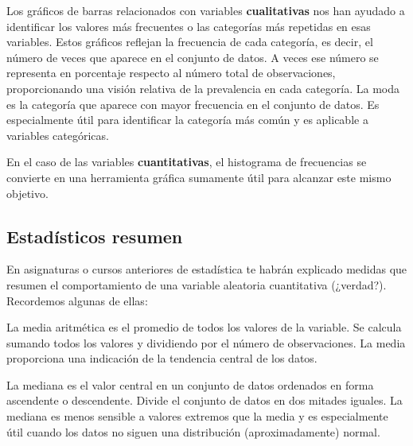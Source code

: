 \documentclass[
  letterpaper,
  DIV=11,
  numbers=noendperiod]{scrreprt}
\begin{document}
Los gráficos de barras relacionados con variables \textbf{cualitativas}
nos han ayudado a identificar los valores más frecuentes o las
categorías más repetidas en esas variables. Estos gráficos reflejan la
frecuencia de cada categoría, es decir, el número de veces que aparece
en el conjunto de datos. A veces ese número se representa en porcentaje
respecto al número total de observaciones, proporcionando una visión
relativa de la prevalencia en cada categoría. La moda es la categoría
que aparece con mayor frecuencia en el conjunto de datos. Es
especialmente útil para identificar la categoría más común y es
aplicable a variables categóricas.

En el caso de las variables \textbf{cuantitativas}, el histograma de
frecuencias se convierte en una herramienta gráfica sumamente útil para
alcanzar este mismo objetivo.

\hypertarget{estaduxedsticos-resumen}{%
\subsection{Estadísticos resumen}\label{estaduxedsticos-resumen}}

En asignaturas o cursos anteriores de estadística te habrán explicado
medidas que resumen el comportamiento de una variable aleatoria
cuantitativa (¿verdad?). Recordemos algunas de ellas:

\begin{tcolorbox}[enhanced jigsaw, arc=.35mm, breakable, coltitle=black, left=2mm, opacityback=0, bottomtitle=1mm, colbacktitle=quarto-callout-note-color!10!white, title=\textcolor{quarto-callout-note-color}{\faInfo}\hspace{0.5em}{Media}, titlerule=0mm, colback=white, colframe=quarto-callout-note-color-frame, bottomrule=.15mm, rightrule=.15mm, opacitybacktitle=0.6, toptitle=1mm, toprule=.15mm, leftrule=.75mm]

La media aritmética es el promedio de todos los valores de la variable.
Se calcula sumando todos los valores y dividiendo por el número de
observaciones. La media proporciona una indicación de la tendencia
central de los datos.

\end{tcolorbox}

\begin{tcolorbox}[enhanced jigsaw, arc=.35mm, breakable, coltitle=black, left=2mm, opacityback=0, bottomtitle=1mm, colbacktitle=quarto-callout-note-color!10!white, title=\textcolor{quarto-callout-note-color}{\faInfo}\hspace{0.5em}{Mediana}, titlerule=0mm, colback=white, colframe=quarto-callout-note-color-frame, bottomrule=.15mm, rightrule=.15mm, opacitybacktitle=0.6, toptitle=1mm, toprule=.15mm, leftrule=.75mm]

La mediana es el valor central en un conjunto de datos ordenados en
forma ascendente o descendente. Divide el conjunto de datos en dos
mitades iguales. La mediana es menos sensible a valores extremos que la
media y es especialmente útil cuando los datos no siguen una
distribución (aproximadamente) normal.

\end{tcolorbox}
\end{document}
